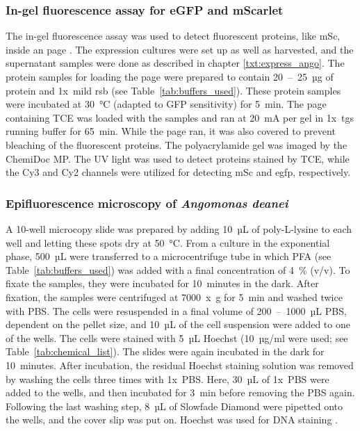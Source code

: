\subsubsection{In-gel fluorescence assay for eGFP and mScarlet} \label{txt:Ingel_Fluorescence}
The in-gel fluorescence assay was used to detect fluorescent proteins, like \gls{mSc}, inside an \gls{page} \parencite{sanial_direct_2025}. The expression cultures were set up as well as harvested, and the supernatant samples were done as described in chapter \ref{txt:express_ango}. The protein samples for loading the \gls{page} were prepared to contain 20~--~25~µg of protein and 1x~mild \gls{rsb} (see Table~\ref{tab:buffers_used}). These protein samples were incubated at 30~°C (adapted to GFP sensitivity) for 5~min. The \gls{page} containing \gls{TCE} was loaded with the samples and ran at 20~mA per gel in 1x~\gls{tgs} running buffer for 65~min. While the \gls{page} ran, it was also covered to prevent bleaching of the fluorescent proteins. The polyacrylamide gel was imaged by the ChemiDoc MP. The UV light was used to detect proteins stained by \gls{TCE}, while the Cy3 and Cy2 channels were utilized for detecting \gls{mSc} and \gls{egfp}, respectively.  
\subsubsection{Epifluorescence microscopy of \textit{Angomonas deanei}} \label{txt:epiflu_micro}
A 10-well microcopy slide was prepared by adding 10~µL of poly-L-lysine to each well and letting these spots dry at 50~°C. From a culture in the exponential phase, 500~µL were transferred to a microcentrifuge tube in which \gls{PFA} (see Table~\ref{tab:buffers_used}) was added with a final concentration of 4~\% (v/v). To fixate the samples, they were incubated for 10~minutes in the dark. After fixation, the samples were centrifuged at 7000~x~g for 5~min and washed twice with \gls{PBS}. The cells were resuspended in a final volume of 200~--~1000~µL PBS, dependent on the pellet size, and 10~µL of the cell suspension were added to one of the wells. The cells were stained with 5~µL Hoechst (10~µg/ml were used; see Table~\ref{tab:chemical_list}). The slides were again incubated in the dark for 10~minutes. After incubation, the residual Hoechst staining solution was removed by washing the cells three times with 1x~\gls{PBS}. Here, 30~µL of 1x~\gls{PBS} were added to the wells, and then incubated for 3~min before removing the \gls{PBS} again. Following the last washing step, 8~µL of Slowfade Diamond were pipetted onto the wells, and the cover slip was put on. Hoechst was used for DNA staining  \parencite{latt_spectral_1976}.

